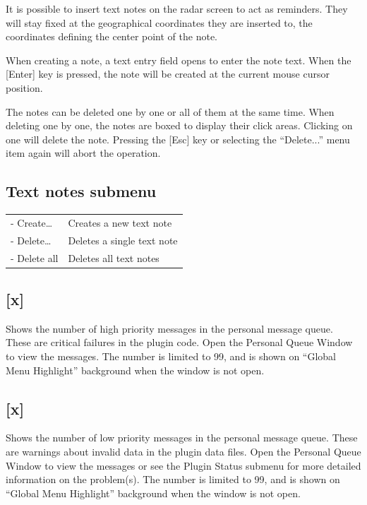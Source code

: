 \documentclass[11pt,a4paper,oldfontcommands]{memoir}
\begin{document}
\medskip

It is possible to insert text notes on the radar screen to act as reminders. They will stay fixed at the
geographical coordinates they are inserted to, the coordinates defining the center point of the note.

When creating a note, a text entry field opens to enter the note text. When the [Enter] key is pressed, the
note will be created at the current mouse cursor position.

The notes can be deleted one by one or all of them at the same time. When deleting one by one, the notes
are boxed to display their click areas. Clicking on one will delete the note. Pressing the [Esc] key or selecting
the “Delete...” menu item again will abort the operation.

\subsection*{Text notes submenu}
\begin{tabular}{p{5cm}p{10cm}}
\\- Create…     & Creates a new text note
\\- Delete…     & Deletes a single text note
\\- Delete all  & Deletes all text notes
\end{tabular}

\medskip

\subsection{[x]}
Shows the number of high priority messages in the personal message queue. These are critical failures in
the plugin code. Open the Personal Queue Window to view the messages. The number is limited to 99, and
is shown on “Global Menu Highlight” background when the window is not open.

\subsection{[x]}
Shows the number of low priority messages in the personal message queue. These are warnings about
invalid data in the plugin data files. Open the Personal Queue Window to view the messages or see the
Plugin Status submenu for more detailed information on the problem(s). The number is limited to 99, and is
shown on “Global Menu Highlight” background when the window is not open.
\end{document}
